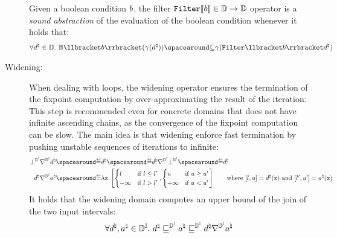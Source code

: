 \begin{description}
  \begin{definition}
    Given a boolean condition $b$, the filter $\textup{\texttt{Filter}} \llbracket b \rrbracket\in\mathbb{D}\to\mathbb{D}$ operator is a \emph{sound abstraction} of the evaluation of the boolean condition whenever it holds that:
  \begin{align*}
    \forall \defabstractvalue\in\abstractdomain.\spacer
    \bexpsemantics
    (\abstractdomainconcretization(\defabstractvalue))
    \SubseteQ
    \abstractdomainconcretization(\abstractdomainfilter \semanticsof{\defbexp}\defabstractvalue)
  \end{align*}
\end{definition}
  \item[Widening:]
  When dealing with loops, the widening operator ensures the termination of the fixpoint computation by over-approximating the result of the iteration.
  This step is recommended even for concrete domains that does not have infinite ascending chains, as the convergence of the fixpoint computation can be slow.
  The main idea is that widening enforce fast termination by pushing unstable sequences of iterations to infinite:
  \begin{align*}
    \intervalabstractdomainbottom \intervalabstractdomainwidening \defabstractvalue &\DefeQ \defabstractvalue  \DefeQ \defabstractvalue \intervalabstractdomainwidening \intervalabstractdomainbottom \DefeQ \defabstractvalue \\
    \defabstractvalue \intervalabstractdomainwidening \defotherabstractvalue &\DefeQ \lambda \defvariable.
      \left[
        \begin{cases}
          l & \text{if } l \le l' \\
          -\infty & \text{if } l > l'
        \end{cases},
        \begin{cases}
          u & \text{if } u \ge u' \\
          +\infty & \text{if } u < u'
        \end{cases}
      \right]
    \tag*{where $\interval{l}{u} = \defabstractvalue(\defvariable)$ and $\interval{l'}{u'} = \defotherabstractvalue(\defvariable)$}
  \end{align*}
  It holds that the widening domain computes an upper bound of the join of the two input intervals:
  \begin{align*}
    \forall \defabstractvalue, \defotherabstractvalue \in \intervalabstractdomaintype.\spacer \defabstractvalue \intervalabstractdomainsubseteq \defotherabstractvalue \intervalabstractdomainsubseteq \defabstractvalue \intervalabstractdomainwidening \defotherabstractvalue

\end{align*}
\end{description}
